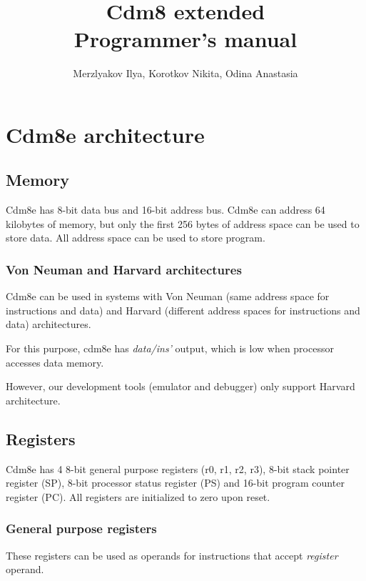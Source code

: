 \documentclass{ol-softwaremanual}
\title{Cdm8 extended \\Programmer's manual}
\author{Merzlyakov Ilya, Korotkov Nikita, Odina Anastasia}
\begin{document}
    \maketitle

    \tableofcontents


    \newpage


    \section{Cdm8e architecture}

    \subsection{Memory}
    Cdm8e has 8-bit data bus and 16-bit address bus. Cdm8e can address 64 kilobytes of memory, but only the first 256 bytes of
    address space can be used to store data. All address space can be used to store program.

    \subsubsection{Von Neuman and Harvard architectures}

    Cdm8e can be used in systems with Von Neuman (same address space for instructions and data) and Harvard (different address spaces for
    instructions and data) architectures.

    For this purpose, cdm8e has \emph{data/ins'} output, which is low when processor accesses data memory.

    However, our development tools (emulator and debugger) only support Harvard architecture.

    \subsection{Registers}
    Cdm8e has 4 8-bit general purpose registers (r0, r1, r2, r3), 8-bit stack pointer register (SP), 8-bit processor status register (PS) and
    16-bit program counter register (PC).
    All registers are initialized to zero upon reset.

    \subsubsection{General purpose registers}
    These registers can be used as operands for instructions that accept \emph{register} operand.
\end{document}
